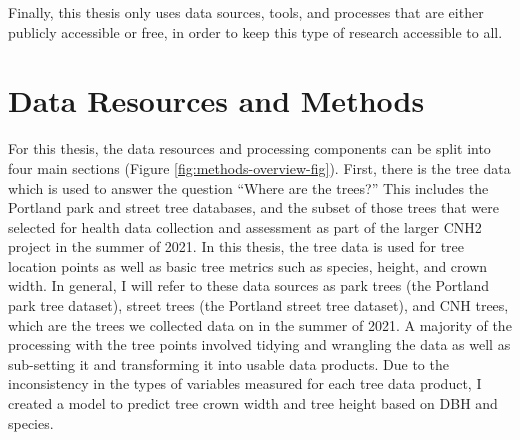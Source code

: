 \documentclass[12pt,twoside]{reedthesis}
\begin{document}
Finally, this thesis only uses data sources, tools, and processes that
are either publicly accessible or free, in order to keep this type of
research accessible to all.

\hypertarget{data-methods}{%
\chapter{Data Resources and Methods}\label{data-methods}}

For this thesis, the data resources and processing components can be
split into four main sections (Figure \ref{fig:methods-overview-fig}).
First, there is the tree data which is used to answer the question
``Where are the trees?'' This includes the Portland park and street tree
databases, and the subset of those trees that were selected for health
data collection and assessment as part of the larger CNH2 project in the
summer of 2021. In this thesis, the tree data is used for tree location
points as well as basic tree metrics such as species, height, and crown
width. In general, I will refer to these data sources as park trees (the
Portland park tree dataset), street trees (the Portland street tree
dataset), and CNH trees, which are the trees we collected data on in the
summer of 2021. A majority of the processing with the tree points
involved tidying and wrangling the data as well as sub-setting it and
transforming it into usable data products. Due to the inconsistency in
the types of variables measured for each tree data product, I created a
model to predict tree crown width and tree height based on DBH and
species.
\end{document}
